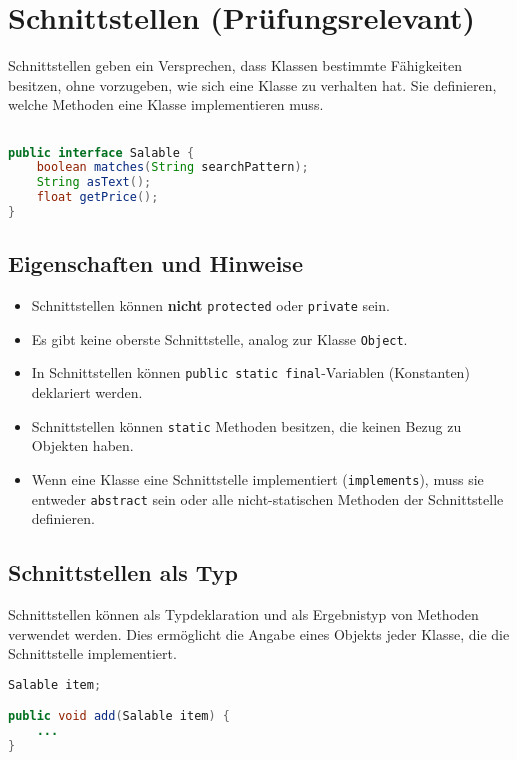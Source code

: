 \chapter{Schnittstellen (Prüfungsrelevant)}

Schnittstellen geben ein Versprechen, dass Klassen bestimmte Fähigkeiten besitzen, ohne vorzugeben, wie sich eine Klasse zu verhalten hat. Sie definieren, welche Methoden eine Klasse implementieren muss.

\begin{lstlisting}[language=Java, caption={Beispiel einer Schnittstelle}]

public interface Salable {
    boolean matches(String searchPattern);
    String asText();
    float getPrice();
}
\end{lstlisting}

\section{Eigenschaften und Hinweise}
\begin{itemize}
    \item Schnittstellen können \textbf{nicht} \lstinline{protected} oder \lstinline{private} sein.
    \item Es gibt keine oberste Schnittstelle, analog zur Klasse \lstinline{Object}.
    \item In Schnittstellen können \lstinline{public static final}-Variablen (Konstanten) deklariert werden.
    \item Schnittstellen können \lstinline{static} Methoden besitzen, die keinen Bezug zu Objekten haben.
    \item Wenn eine Klasse eine Schnittstelle implementiert (\lstinline{implements}), muss sie entweder \texttt{abstract} sein oder alle nicht-statischen Methoden der Schnittstelle definieren.
\end{itemize}

\section{Schnittstellen als Typ}
Schnittstellen können als Typdeklaration und als Ergebnistyp von Methoden verwendet werden. Dies ermöglicht die Angabe eines Objekts jeder Klasse, die die Schnittstelle implementiert.
\begin{lstlisting}[language=Java, caption={Schnittstelle als Typ}]
Salable item;

public void add(Salable item) {
    ...
}
\end{lstlisting}

